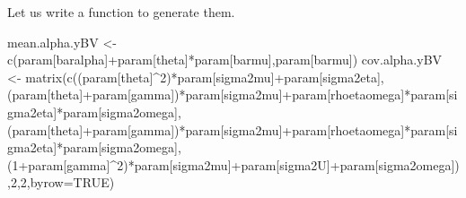 \documentclass[
]{book}
\newenvironment{Shaded}{\begin{snugshade}}{\end{snugshade}}
\newcommand{\AttributeTok}[1]{\textcolor[rgb]{0.77,0.63,0.00}{#1}}
\newcommand{\ConstantTok}[1]{\textcolor[rgb]{0.00,0.00,0.00}{#1}}
\newcommand{\DecValTok}[1]{\textcolor[rgb]{0.00,0.00,0.81}{#1}}
\newcommand{\FunctionTok}[1]{\textcolor[rgb]{0.00,0.00,0.00}{#1}}
\newcommand{\NormalTok}[1]{#1}
\newcommand{\OtherTok}[1]{\textcolor[rgb]{0.56,0.35,0.01}{#1}}
\newcommand{\SpecialCharTok}[1]{\textcolor[rgb]{0.00,0.00,0.00}{#1}}
\newcommand{\StringTok}[1]{\textcolor[rgb]{0.31,0.60,0.02}{#1}}
\theoremstyle{definition}
\theoremstyle{definition}
\theoremstyle{definition}
\theoremstyle{definition}
\theoremstyle{remark}
\begin{document}
Let us write a function to generate them.

\begin{Shaded}
\begin{Highlighting}[]
\NormalTok{mean.alpha.yBV }\OtherTok{\textless{}{-}} \FunctionTok{c}\NormalTok{(param[}\StringTok{\textquotesingle{}baralpha\textquotesingle{}}\NormalTok{]}\SpecialCharTok{+}\NormalTok{param[}\StringTok{\textquotesingle{}theta\textquotesingle{}}\NormalTok{]}\SpecialCharTok{*}\NormalTok{param[}\StringTok{\textquotesingle{}barmu\textquotesingle{}}\NormalTok{],param[}\StringTok{\textquotesingle{}barmu\textquotesingle{}}\NormalTok{])}
\NormalTok{cov.alpha.yBV }\OtherTok{\textless{}{-}} \FunctionTok{matrix}\NormalTok{(}\FunctionTok{c}\NormalTok{((param[}\StringTok{\textquotesingle{}theta\textquotesingle{}}\NormalTok{]}\SpecialCharTok{\^{}}\DecValTok{2}\NormalTok{)}\SpecialCharTok{*}\NormalTok{param[}\StringTok{\textquotesingle{}sigma2mu\textquotesingle{}}\NormalTok{]}\SpecialCharTok{+}\NormalTok{param[}\StringTok{\textquotesingle{}sigma2eta\textquotesingle{}}\NormalTok{],}
\NormalTok{                          (param[}\StringTok{\textquotesingle{}theta\textquotesingle{}}\NormalTok{]}\SpecialCharTok{+}\NormalTok{param[}\StringTok{\textquotesingle{}gamma\textquotesingle{}}\NormalTok{])}\SpecialCharTok{*}\NormalTok{param[}\StringTok{\textquotesingle{}sigma2mu\textquotesingle{}}\NormalTok{]}\SpecialCharTok{+}\NormalTok{param[}\StringTok{\textquotesingle{}rhoetaomega\textquotesingle{}}\NormalTok{]}\SpecialCharTok{*}\NormalTok{param[}\StringTok{\textquotesingle{}sigma2eta\textquotesingle{}}\NormalTok{]}\SpecialCharTok{*}\NormalTok{param[}\StringTok{\textquotesingle{}sigma2omega\textquotesingle{}}\NormalTok{],}
\NormalTok{                            (param[}\StringTok{\textquotesingle{}theta\textquotesingle{}}\NormalTok{]}\SpecialCharTok{+}\NormalTok{param[}\StringTok{\textquotesingle{}gamma\textquotesingle{}}\NormalTok{])}\SpecialCharTok{*}\NormalTok{param[}\StringTok{\textquotesingle{}sigma2mu\textquotesingle{}}\NormalTok{]}\SpecialCharTok{+}\NormalTok{param[}\StringTok{\textquotesingle{}rhoetaomega\textquotesingle{}}\NormalTok{]}\SpecialCharTok{*}\NormalTok{param[}\StringTok{\textquotesingle{}sigma2eta\textquotesingle{}}\NormalTok{]}\SpecialCharTok{*}\NormalTok{param[}\StringTok{\textquotesingle{}sigma2omega\textquotesingle{}}\NormalTok{],}
\NormalTok{                            (}\DecValTok{1}\SpecialCharTok{+}\NormalTok{param[}\StringTok{\textquotesingle{}gamma\textquotesingle{}}\NormalTok{]}\SpecialCharTok{\^{}}\DecValTok{2}\NormalTok{)}\SpecialCharTok{*}\NormalTok{param[}\StringTok{\textquotesingle{}sigma2mu\textquotesingle{}}\NormalTok{]}\SpecialCharTok{+}\NormalTok{param[}\StringTok{\textquotesingle{}sigma2U\textquotesingle{}}\NormalTok{]}\SpecialCharTok{+}\NormalTok{param[}\StringTok{\textquotesingle{}sigma2omega\textquotesingle{}}\NormalTok{]),}\DecValTok{2}\NormalTok{,}\DecValTok{2}\NormalTok{,}\AttributeTok{byrow=}\ConstantTok{TRUE}\NormalTok{)}

\end{Highlighting}
\end{Shaded}
\end{document}
